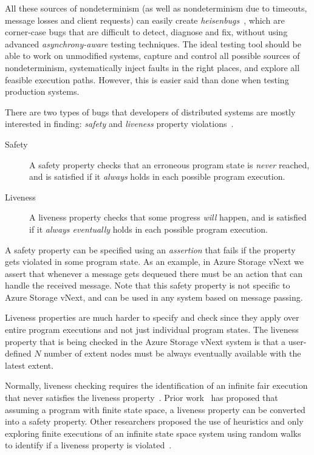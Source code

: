 All these sources of nondeterminism (as well as nondeterminism due to timeouts, message losses and client requests) can easily create \emph{heisenbugs}~\cite{gray1986computers, musuvathi2008finding}, which are corner-case bugs that are difficult to detect, diagnose and fix, without using advanced \emph{asynchrony-aware} testing techniques.
%
The ideal testing tool should be able to work on unmodified systems, capture and control all possible sources of nondeterminism, systematically inject faults in the right places, and explore all feasible execution paths. However, this is easier said than done when testing production systems.

There are two types of bugs that developers of distributed systems are mostly interested in finding: \emph{safety} and \emph{liveness} property violations~\cite{lamport1977proving}.


\begin{description}
\item[Safety] A safety property checks that an erroneous program state is \emph{never} reached, and is satisfied if it \emph{always} holds in each possible program execution.

\item[Liveness] A liveness property checks that some progress \emph{will} happen, and is satisfied if it \emph{always eventually} holds in each possible program execution.
\end{description}

\noindent
A safety property can be specified using an \emph{assertion} that fails if the property gets violated in some program state. As an example, in Azure Storage vNext we assert that whenever a message gets dequeued there must be an action that can handle the received message. Note that this safety property is not specific to Azure Storage vNext, and can be used in any system based on message passing.

Liveness properties are much harder to specify and check since they apply over entire program executions and not just individual program states. The liveness property that is being checked in the Azure Storage vNext system is that a user-defined $N$ number of extent nodes must be always eventually available with the latest extent. 

Normally, liveness checking requires the identification of an infinite fair execution that never satisfies the liveness property~\cite{schuppan2004efficient, musuvathi2008fair}. Prior work~\cite{schuppan2004efficient} has proposed that assuming a program with finite state space, a liveness property can be converted into a safety property. Other researchers proposed the use of heuristics and only exploring finite executions of an infinite state space system using random walks to identify if a liveness property is violated~\cite{killian2007life}.

